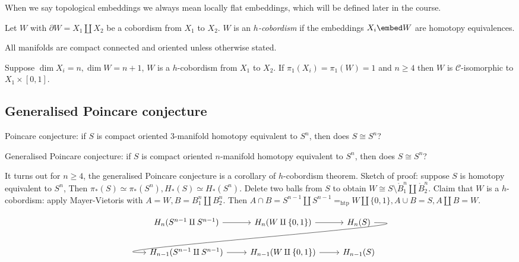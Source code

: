 \documentclass[a4paper]{article}
\renewcommand{\boundary}{\partial}
\newcommand{\interior}{\ocirc}
\begin{document}
\begin{convention}
  When we say topological embeddings we always mean locally flat embeddings, which will be defined later in the course.
\end{convention}

\begin{definition}[\(h\)-cobordism]
  Let \(W\) with \(\boundary W = X_1 \amalg X_2\) be a cobordism from \(X_1\) to \(X_2\). \(W\) is an \emph{\(h\)-cobordism} if the embeddings \(X_i \embed W\) are homotopy equivalences.
\end{definition}

\begin{convention}
  All manifolds are compact connected and oriented unless otherwise stated.
\end{convention}

\begin{theorem}[\(h\)-cobordism]
  Suppose \(\dim X_i = n, \dim W = n + 1\), \(W\) is a \(h\)-cobordism from \(X_1\) to \(X_2\). If \(\pi_1(X_i) = \pi_1(W) = 1\) and \(n \geq 4\) then \(W\) is \(\mathcal C\)-isomorphic to \(X_1 \times [0, 1]\).
\end{theorem}

\subsection{Generalised Poincare conjecture}

Poincare conjecture: if \(S\) is compact oriented \(3\)-manifold homotopy equivalent to \(S^n\), then does \(S \cong S^n\)?

Generalised Poincare conjecture: if \(S\) is compact oriented \(n\)-manifold homotopy equivalent to \(S^n\), then does \(S \cong S^n\)?

It turns out for \(n \geq 4\), the generalised Poincare conjecture is a corollary of \(h\)-cobordism theorem. Sketch of proof: suppose \(S\) is homotopy equivalent to \(S^n\), Then \(\pi_*(S) \simeq \pi_*(S^n), H_*(S) \simeq H_*(S^n)\). Delete two balls from \(S\) to obtain \(W \cong S \setminus \interior B_1^n \amalg \interior B_2^n\). Claim that \(W\) is a \(h\)-cobordism: apply Mayer-Vietoris with \(A = W, B = B_1^n \amalg B_2^n\). Then \(A \cap B = S^{n - 1} \amalg S^{n - 1} =_{\text{htp}} W \amalg \{0, 1\}, A \cup B = S, A \amalg B = W \).

\[
  \begin{tikzcd}
    H_n(S^{n - 1} \amalg S^{n - 1}) \ar[r] & H_n(W \amalg \{0, 1\}) \ar[r] & H_n(S) \ar[dll, out=0, in=180] \\
    H_{n - 1}(S^{n - 1} \amalg S^{n - 1}) \ar[r] & H_{n - 1}(W \amalg \{0, 1\}) \ar[r] & H_{n - 1}(S)
  \end{tikzcd}
\]
\end{document}

